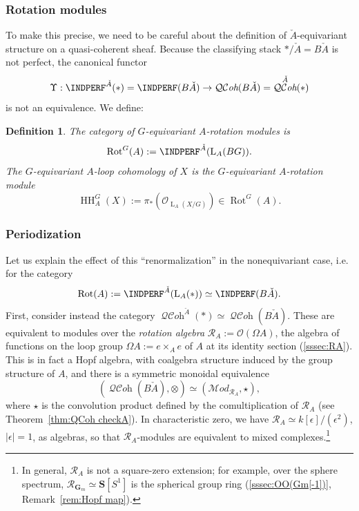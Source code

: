 \documentclass[12pt, oneside]{amsart}
\numberwithin{equation}{section}
\newtheorem{definition}[subsubsection]{Definition}
\theoremstyle{remark}
\theoremstyle{plain}
\newcommand{\MOD}{\mathcal{M}\textit{od}}
\DeclareMathOperator{\QCOH}{\mathcal{QC}\textit{oh}}
\newcommand{\R}{\mathcal{R}}
\newcommand{\RA}{\R_A}
\newcommand{\Loop}{\operatorname{L}}
\newcommand{\OO}{\mathcal{O}}
\newcommand{\GGm}{\mathbf{G}_{m}}
\newcommand{\Ren}{\Upsilon}
\newcommand{\HH}{\operatorname{HH}}
\newcommand{\Rot}{\operatorname{Rot}}
\begin{document}
\subsubsection{Rotation modules}\label{sssec:intro/shv/def}

To make this precise, we need to be careful about the definition of $\check{A}$-equivariant structure on a quasi-coherent sheaf.
Because the classifying stack $*/\check{A} = B\check{A}$ is not perfect, the canonical functor
\[ \Ren : \INDPERF^{\check{A}}(*) = \INDPERF(B\check{A}) \to \QCOH(B\check{A}) = \QCOH^{\check{A}}(*) \]
is not an equivalence.
We define:

\begin{definition}
	The category of \emph{$G$-equivariant $A$-rotation modules} is
	\[ \Rot^G(A) := \INDPERF^{\check{A}}(\Loop_A(BG)). \]
	The \emph{$G$-equivariant $A$-loop cohomology} of $X$ is the $G$-equivariant $A$-rotation module
	\[ \HH_A^G(X) := \pi_*(\OO_{\Loop_A(X/G)}) \in \Rot^G(A). \]
\end{definition}

\subsubsection{Periodization}

Let us explain the effect of this ``renormalization'' in the nonequivariant case, i.e. for the category
\[ \Rot(A) := \INDPERF^{\check{A}}(\Loop_A(*)) \simeq \INDPERF(B\check{A}). \]
First, consider instead the category $\QCOH^{\check{A}}(*) \simeq \QCOH(B\check{A})$.
These are equivalent to modules over the \emph{rotation algebra} $\RA := \OO(\Omega A)$, the algebra of functions on the loop group $\Omega A := e \times_A e$ of $A$ at its identity section (\ref{sssec:RA}).
This is in fact a Hopf algebra, with coalgebra structure induced by the group structure of $A$, and there is a symmetric monoidal equivalence
\[ (\QCOH(B\check{A}), \otimes) \simeq (\MOD_{\RA}, \star), \]
where $\star$ is the convolution product defined by the comultiplication of $\RA$ (see Theorem~\ref{thm:QCoh checkA}).
In characteristic zero, we have $\RA \simeq k[\epsilon]/(\epsilon^2)$, $|\epsilon| = 1$, as algebras, so that $\RA$-modules are equivalent to mixed complexes.\footnote{%
  In general, $\RA$ is not a square-zero extension; for example, over the sphere spectrum, $\R_{\GGm} \simeq \mathbf{S}[S^1]$ is the spherical group ring (\ref{sssec:OO(Gm[-1])}, Remark~\ref{rem:Hopf map}).
}
\end{document}
